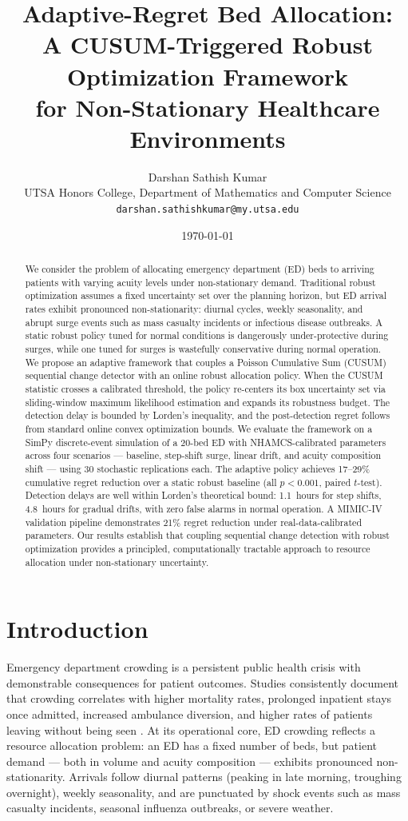 \documentclass[11pt,twocolumn]{article}
\title{Adaptive-Regret Bed Allocation: \\
A CUSUM-Triggered Robust Optimization Framework \\
for Non-Stationary Healthcare Environments}
\author{Darshan Sathish Kumar \\
UTSA Honors College, Department of Mathematics and Computer Science\\
\texttt{darshan.sathishkumar@my.utsa.edu}}
\date{\today}
\theoremstyle{plain}
\theoremstyle{definition}
\begin{document}
\maketitle

\begin{abstract}
We consider the problem of allocating emergency department (ED) beds to arriving patients with varying acuity levels under non-stationary demand. Traditional robust optimization assumes a fixed uncertainty set over the planning horizon, but ED arrival rates exhibit pronounced non-stationarity: diurnal cycles, weekly seasonality, and abrupt surge events such as mass casualty incidents or infectious disease outbreaks. A static robust policy tuned for normal conditions is dangerously under-protective during surges, while one tuned for surges is wastefully conservative during normal operation. We propose an adaptive framework that couples a Poisson Cumulative Sum (CUSUM) sequential change detector with an online robust allocation policy. When the CUSUM statistic crosses a calibrated threshold, the policy re-centers its box uncertainty set via sliding-window maximum likelihood estimation and expands its robustness budget. The detection delay is bounded by Lorden's inequality, and the post-detection regret follows from standard online convex optimization bounds. We evaluate the framework on a SimPy discrete-event simulation of a 20-bed ED with NHAMCS-calibrated parameters across four scenarios --- baseline, step-shift surge, linear drift, and acuity composition shift --- using 30 stochastic replications each. The adaptive policy achieves 17--29\% cumulative regret reduction over a static robust baseline (all $p < 0.001$, paired $t$-test). Detection delays are well within Lorden's theoretical bound: 1.1~hours for step shifts, 4.8~hours for gradual drifts, with zero false alarms in normal operation. A MIMIC-IV validation pipeline demonstrates 21\% regret reduction under real-data-calibrated parameters. Our results establish that coupling sequential change detection with robust optimization provides a principled, computationally tractable approach to resource allocation under non-stationary uncertainty.
\end{abstract}

\section{Introduction}

Emergency department crowding is a persistent public health crisis with demonstrable consequences for patient outcomes. Studies consistently document that crowding correlates with higher mortality rates, prolonged inpatient stays once admitted, increased ambulance diversion, and higher rates of patients leaving without being seen \cite{sridhar2013patient,golshani2019bed}. At its operational core, ED crowding reflects a resource allocation problem: an ED has a fixed number of beds, but patient demand --- both in volume and acuity composition --- exhibits pronounced non-stationarity. Arrivals follow diurnal patterns (peaking in late morning, troughing overnight), weekly seasonality, and are punctuated by shock events such as mass casualty incidents, seasonal influenza outbreaks, or severe weather.
\end{document}
